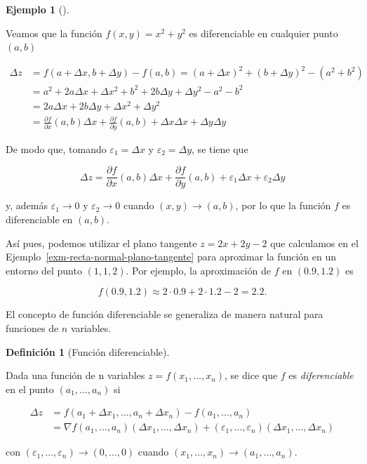 \documentclass[
  a4paper,
]{scrreport}
\theoremstyle{plain}
\theoremstyle{plain}
\theoremstyle{definition}
\newtheorem{definition}{Definición}[chapter]
\theoremstyle{definition}
\newtheorem{example}{Ejemplo}[chapter]
\theoremstyle{plain}
\theoremstyle{definition}
\theoremstyle{remark}
\begin{document}
\begin{example}[]\protect\hypertarget{exm-aproximacion-funcion-dos-variables-plano-tangente}{}\label{exm-aproximacion-funcion-dos-variables-plano-tangente}

Veamos que la función \(f(x,y)=x^2 + y^2\) es diferenciable en cualquier
punto \((a,b)\)

\begin{align*}
\Delta z 
&= f(a+\Delta x, b+\Delta y) - f(a,b) 
= (a+\Delta x)^2 + (b+\Delta y)^2 - (a^2 + b^2) \\
&= a^2 + 2a\Delta x + \Delta x^2 + b^2 + 2b\Delta y + \Delta y^2 - a^2 - b^2\\
&= 2a\Delta x + 2b\Delta y + \Delta x^2 + \Delta y^2 \\
&= \frac{\partial f}{\partial x}(a,b) \Delta x + \frac{\partial f}{\partial y}(a,b) + \Delta x \Delta x + \Delta y \Delta y
\end{align*}

De modo que, tomando \(\varepsilon_1 = \Delta x\) y
\(\varepsilon_2 = \Delta y\), se tiene que

\[
\Delta z = \frac{\partial f}{\partial x}(a,b) \Delta x + \frac{\partial f}{\partial y}(a,b) + \varepsilon_1 \Delta x + \varepsilon_2 \Delta y
\]

y, además \(\varepsilon_1\to 0\) y \(\varepsilon_2\to 0\) cuando
\((x,y)\to (a,b)\), por lo que la función \(f\) es diferenciable en
\((a,b)\).

Así pues, podemos utilizar el plano tangente \(z = 2x+2y-2\) que
calculamos en el Ejemplo~\ref{exm-recta-normal-plano-tangente} para
aproximar la función en un entorno del punto \((1, 1, 2)\). Por ejemplo,
la aproximación de \(f\) en \((0.9, 1.2)\) es

\[
f(0.9, 1.2) \approx 2\cdot 0.9 + 2\cdot 1.2 - 2 = 2.2.
\]

\end{example}

El concepto de función diferenciable se generaliza de manera natural
para funciones de \(n\) variables.

\begin{definition}[Función
diferenciable]\protect\hypertarget{def-funcion-varias-variables-diferenciable}{}\label{def-funcion-varias-variables-diferenciable}

Dada una función de n variables \(z=f(x_1,\ldots,x_n)\), se dice que
\(f\) es \emph{diferenciable} en el punto \((a_1,\ldots,a_n)\) si

\begin{align*}
\Delta z 
&= f(a_1+\Delta x_1, \ldots, a_n+\Delta x_n) - f(a_1,\ldots,a_n) \\
&= \nabla f(a_1,\ldots,a_n) (\Delta x_1,\ldots, \Delta x_n) + (\varepsilon_1,\ldots, \varepsilon_n)(\Delta x_1,\ldots, \Delta x_n)
\end{align*}

con \((\varepsilon_1,\ldots, \varepsilon_n) \to (0,\ldots,0)\) cuando
\((x_1,\ldots,x_n)\to (a_1,\ldots,a_n)\).

\end{definition}
\end{document}
